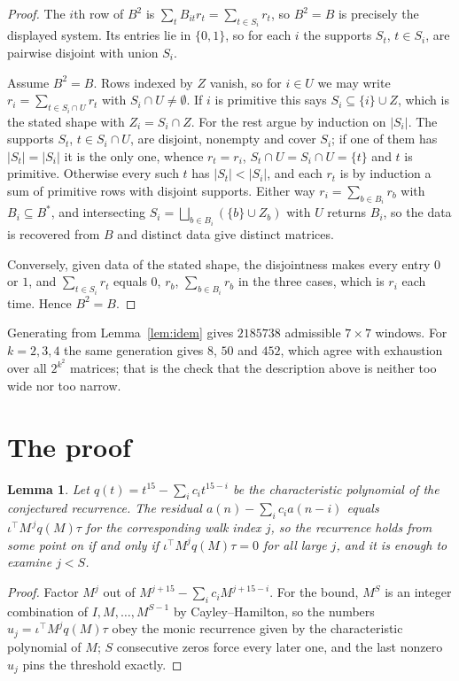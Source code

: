 \documentclass[11pt,a4paper]{article}
\theoremstyle{plain}
\newtheorem{lemma}[theorem]{Lemma}
\theoremstyle{definition}
\begin{document}
\begin{proof}
The $i$th row of $B^2$ is $\sum_t B_{it}r_t=\sum_{t\in S_i}r_t$, so $B^2=B$ is precisely the
displayed system. Its entries lie in $\{0,1\}$, so for each $i$ the supports $S_t$,
$t\in S_i$, are pairwise disjoint with union $S_i$.

Assume $B^2=B$. Rows indexed by $Z$ vanish, so for $i\in U$ we may write
$r_i=\sum_{t\in S_i\cap U}r_t$ with $S_i\cap U\neq\emptyset$. If $i$ is primitive this says
$S_i\subseteq\{i\}\cup Z$, which is the stated shape with $Z_i=S_i\cap Z$. For the rest argue
by induction on $|S_i|$. The supports $S_t$, $t\in S_i\cap U$, are disjoint, nonempty and
cover $S_i$; if one of them has $|S_t|=|S_i|$ it is the only one, whence $r_t=r_i$,
$S_t\cap U=S_i\cap U=\{t\}$ and $t$ is primitive. Otherwise every such $t$ has
$|S_t|<|S_i|$, and each $r_t$ is by induction a sum of primitive rows with disjoint supports.
Either way $r_i=\sum_{b\in B_i}r_b$ with $B_i\subseteq B^{\ast}$, and intersecting
$S_i=\bigsqcup_{b\in B_i}(\{b\}\cup Z_b)$ with $U$ returns $B_i$, so the data is recovered
from $B$ and distinct data give distinct matrices.

Conversely, given data of the stated shape, the disjointness makes every entry $0$ or $1$, and
$\sum_{t\in S_i}r_t$ equals $0$, $r_b$, $\sum_{b\in B_i}r_b$ in the three cases, which is
$r_i$ each time. Hence $B^2=B$.
\end{proof}

Generating from Lemma~\ref{lem:idem} gives $2185738$ admissible $7\times7$ windows. For
$k=2,3,4$ the same generation gives $8$, $50$ and $452$, which agree with exhaustion over all
$2^{k^2}$ matrices; that is the check that the description above is neither too wide nor too
narrow.

\section{The proof}

\begin{lemma}\label{lem:crit}
Let $q(t)=t^{15}-\sum_i c_it^{15-i}$ be the characteristic polynomial of the
conjectured recurrence. The residual $a(n)-\sum_ic_ia(n-i)$ equals
$\iota^{\!\top}M^{\,j}q(M)\tau$ for the corresponding walk index $j$, so the recurrence
holds from some point on if and only if $\iota^{\!\top}M^{j}q(M)\tau=0$ for all large $j$,
and it is enough to examine $j<S$.
\end{lemma}

\begin{proof}
Factor $M^{j}$ out of $M^{j+15}-\sum_ic_iM^{j+15-i}$. For the bound, $M^{S}$
is an integer combination of $I,M,\dots,M^{S-1}$ by Cayley--Hamilton, so the numbers
$u_j=\iota^{\!\top}M^{j}q(M)\tau$ obey the monic recurrence given by the characteristic
polynomial of $M$; $S$ consecutive zeros force every later one, and the last nonzero $u_j$
pins the threshold exactly.
\end{proof}
\end{document}
